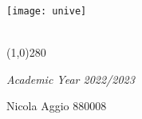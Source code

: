 \newcommand{\image}[3]{ %
	\begin{figure}[H]
		\centering
		\texttt{[image: \#1]} 
		\caption{#2}
	\end{figure}
	\FloatBarrier
}

\newcommand{\imageb}[2]{ %
	\begin{figure}[H]
		\centering
		\texttt{[image: \#1]} 
	\end{figure}
	\FloatBarrier
}

\newcommand{\imageLabel}[4]{ %
	\begin{figure}[H]
		\centering
		\texttt{[image: \#1]} 
		\caption{#2}
		\label{fig:#4}
	\end{figure}
	\FloatBarrier
}
\newcommand{\Z}{\mathbb{Z}}

\begin{titlepage}
	\begin{center}
		\texttt{[image: unive]}
		
		\vspace*{1cm}
		\LARGE
		
		\vspace{0.5cm}
		\Huge
		\textbf{\titolo}\\
		
		\line(1,0){280}
		
		\vspace{0.5cm}
		\large
		\textit{Academic Year 2022/2023}
		
		\vfill
		
	\end{center}
	\begin{raggedleft}
		\Large
		\large
		Nicola Aggio 880008\\
	\end{raggedleft}
\end{titlepage}


\renewcommand{\headheight}{14pt}

\pagestyle{fancy}
\lhead{}
\chead{}
\lhead{}
\rhead{\textbf{\titolo}}
\cfoot{}
\renewcommand{\headrulewidth}{0.4pt}
\renewcommand{\footrulewidth}{0.4pt}

